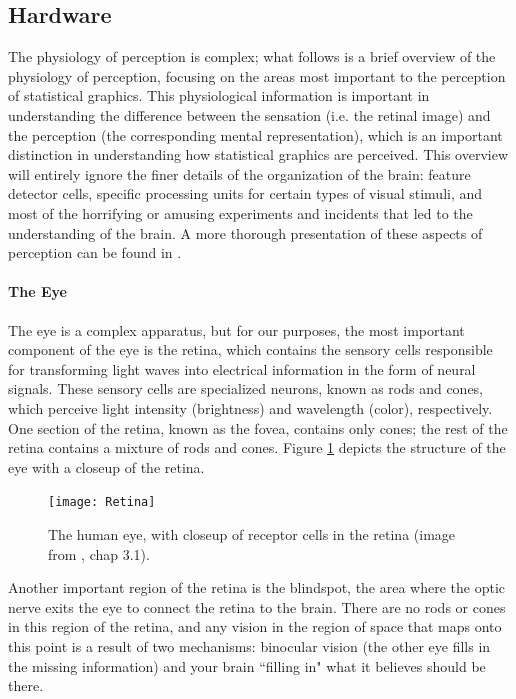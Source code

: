 \documentclass[11pt]{isuthesis}\usepackage[]{graphicx}\usepackage[]{color}
\begin{document}
\subsection{Hardware}
The physiology of perception is complex; what follows is a brief overview of the physiology of perception, focusing on the areas most important to the perception of statistical graphics. This physiological information is important in understanding the difference between the sensation (i.e. the retinal image) and the perception (the corresponding mental representation), which is an important distinction in understanding how statistical graphics are perceived. This overview will entirely ignore the finer details of the organization of the brain: feature detector cells, specific processing units for certain types of visual stimuli, and most of the horrifying or amusing experiments and incidents that led to the understanding of the brain. A more thorough presentation of these aspects of perception can be found in \citet{goldstein}. 

\paragraph{The Eye}
The eye is a complex apparatus, but for our purposes, the most important component of the eye is the retina, which contains the sensory cells responsible for transforming light waves into electrical information in the form of neural signals. These sensory cells are specialized neurons, known as rods and cones, which perceive light intensity (brightness) and wavelength (color), respectively. One section of the retina, known as the fovea, contains only cones; the rest of the retina contains a mixture of rods and cones. Figure \ref{fig:retina} depicts the structure of the eye with a closeup of the retina. 

\begin{figure}
\centering
\texttt{[image: Retina]}
\caption[The human eye, with closeup of receptor cells in the retina]{The human eye, with closeup of receptor cells in the retina (image from \protect\citealt{goldstein}, chap 3.1).} \label{fig:retina}
\end{figure}

Another important region of the retina is the blindspot, the area where the optic nerve exits the eye to connect the retina to the brain. There are no rods or cones in this region of the retina, and any vision in the region of space that maps onto this point is a result of two mechanisms: binocular vision (the other eye fills in the missing information) and your brain ``filling in" what it believes should be there.
\end{document}
